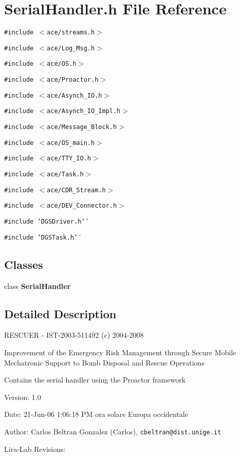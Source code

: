 \section{Serial\-Handler.h File Reference}
\label{SerialHandler_8h}
{\tt \#include $<$ace/streams.h$>$}\par
{\tt \#include $<$ace/Log\_\-Msg.h$>$}\par
{\tt \#include $<$ace/OS.h$>$}\par
{\tt \#include $<$ace/Proactor.h$>$}\par
{\tt \#include $<$ace/Asynch\_\-IO.h$>$}\par
{\tt \#include $<$ace/Asynch\_\-IO\_\-Impl.h$>$}\par
{\tt \#include $<$ace/Message\_\-Block.h$>$}\par
{\tt \#include $<$ace/OS\_\-main.h$>$}\par
{\tt \#include $<$ace/TTY\_\-IO.h$>$}\par
{\tt \#include $<$ace/Task.h$>$}\par
{\tt \#include $<$ace/CDR\_\-Stream.h$>$}\par
{\tt \#include $<$ace/DEV\_\-Connector.h$>$}\par
{\tt \#include \char`\"{}DGSDriver.h\char`\"{}}\par
{\tt \#include \char`\"{}DGSTask.h\char`\"{}}\par
\subsection*{Classes}
\begin{CompactItemize}
\item 
class {\bf Serial\-Handler}
\end{CompactItemize}


\subsection{Detailed Description}
RESCUER - IST-2003-511492 (c) 2004-2008

Improvement of the Emergency Risk Management through Secure Mobile Mechatronic Support to Bomb Disposal and Rescue Operations

Contains the serial handler using the Proactor framework \begin{Desc}
\item[Version:]1.0 \end{Desc}
\begin{Desc}
\item[Date:]21-Jun-06 1:06:18 PM ora solare Europa occidentale \end{Desc}
\begin{Desc}
\item[Author:]Carlos Beltran Gonzalez (Carlos), {\tt cbeltran@dist.unige.it} 

Lira-Lab Revisions:\end{Desc}
